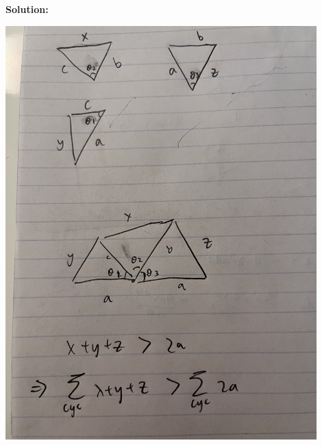 
\begin{solution}
\textbf{Solution}\textbf{:}\V

\begin{center}
\includegraphics[width=12cm]{IMG_2573.jpg}
\end{center}
\end{solution}\V